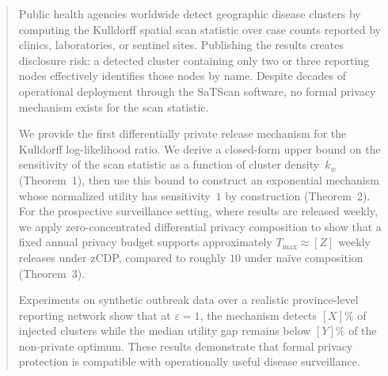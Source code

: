 \begin{abstract}
    Public health agencies worldwide detect geographic disease clusters
    by computing the Kulldorff spatial scan statistic over case counts
    reported by clinics, laboratories, or sentinel sites. Publishing the
    results creates disclosure risk: a detected cluster containing only
    two or three reporting nodes effectively identifies those nodes by
    name. Despite decades of operational deployment through the SaTScan
    software, no formal privacy mechanism exists for the scan statistic.

    We provide the first differentially private release mechanism for
    the Kulldorff log-likelihood ratio. We derive a closed-form upper
    bound on the sensitivity of the scan statistic as a function of
    cluster density~$k_w$ (Theorem~1), then use this bound to construct
    an exponential mechanism whose normalized utility has sensitivity~$1$
    by construction (Theorem~2). For the prospective surveillance
    setting, where results are released weekly, we apply
    zero-concentrated differential privacy composition to show that a
    fixed annual privacy budget supports approximately
    $T_{\max} \approx [Z]$ weekly releases under zCDP, compared to
    roughly $10$ under na\"ive composition (Theorem~3).

    Experiments on synthetic outbreak data over a realistic
    province-level reporting network show that at $\varepsilon = 1$,
    the mechanism detects $[X]\%$ of injected clusters while the
    median utility gap remains below $[Y]\%$ of the non-private optimum.
    These results demonstrate that formal privacy protection is
    compatible with operationally useful disease surveillance.
\end{abstract}